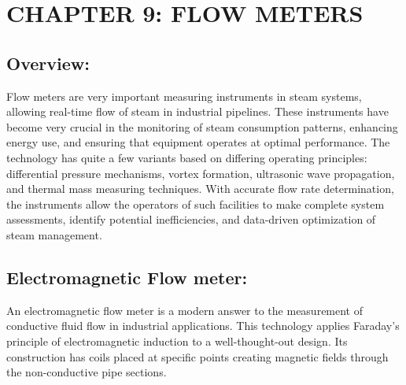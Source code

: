 \section{CHAPTER 9: FLOW METERS}

\subsection{Overview:}
Flow meters are very important measuring instruments in steam systems, allowing real-time flow of steam in industrial pipelines. These instruments have become very crucial in the monitoring of steam consumption patterns, enhancing energy use, and ensuring that equipment operates at optimal performance. The technology has quite a few variants based on differing operating principles: differential pressure mechanisms, vortex formation, ultrasonic wave propagation, and thermal mass measuring techniques. With accurate flow rate determination, the instruments allow the operators of such facilities to make complete system assessments, identify potential inefficiencies, and data-driven optimization of steam management.

\subsection{Electromagnetic Flow meter:}
An electromagnetic flow meter is a modern answer to the measurement of conductive fluid flow in industrial applications. This technology applies Faraday's principle of electromagnetic induction to a well-thought-out design. Its construction has coils placed at specific points creating magnetic fields through the non-conductive pipe sections.

